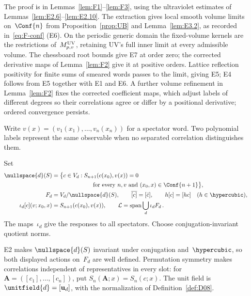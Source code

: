 The proof is in Lemmas~\ref{lem:F1}--\ref{lem:F3}, using the ultraviolet estimates of Lemmas~\ref{lem:E2.6}--\ref{lem:E2.10}. The extraction gives local smooth volume limits on~$\Conf{n}$ from Proposition~\ref{prop:UB} and Lemma~\ref{lem:E3.2}, as recorded in~\eqref{eq:F-conf} (E6). On the periodic generic domain the fixed-volume kernels are the restrictions of~$M^{\rm UV}_{p,v}$, retaining UV's full inner limit at every admissible volume. The chessboard root bounds give E7 at order zero; the corrected derivative maps of Lemma~\ref{lem:F2} give it at positive orders. Lattice reflection positivity for finite sums of smeared words passes to the limit, giving E5; E4 follows from E5 together with E1 and E6. A further volume refinement in Lemma~\ref{lem:F2} fixes the corrected coefficient maps, which adjust labels of different degrees so their correlations agree or differ by a positional derivative; ordered convergence persists.

Write $v(x)=(v_1(x_1),\ldots,v_n(x_n))$ for a spectator word. Two polynomial labels represent the same observable when no separated correlation distinguishes them.
\begin{definition}\label{def:D10}
Set
\begin{align*}
\nullspace{d}(S)&=\bigl\{c\in V_d:S_{n+1}(c(x_0),v(x))=0\\
&\hspace{7em}\text{for every }n,v\text{ and }(x_0,x)\in\Conf{n+1}\bigr\},\\
F_d&=V_d/\nullspace{d}(S),\qquad \overline{[c]}=[\bar c],\qquad h[c]=[hc]\quad(h\in\hypercubic),\\
\iota_d[c](v;x_0,x)&=S_{n+1}(c(x_0),v(x)),\qquad
\mathcal L=\operatorname{span}\bigcup_d\iota_dF_d\,.
\end{align*}
The maps~$\iota_d$ give the responses to all spectators. Choose conjugation-invariant quotient norms.
\end{definition}
E2 makes $\nullspace{d}(S)$ invariant under conjugation and~$\hypercubic$, so both displayed actions on~$F_d$ are well defined. Permutation symmetry makes correlations independent of representatives in every slot: for $\boldsymbol A=([c_1],\ldots,[c_n])$, put $S_n(\boldsymbol A;x)=S_n(c;x)$. The unit field is $\unitfield{d}=[\mathbf u_d]$, with the normalization of Definition~\ref{def:D08}.

